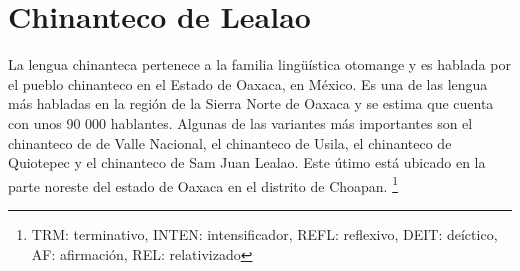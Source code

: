 \section*{Chinanteco de Lealao}

\noindent La lengua chinanteca pertenece a la familia lingüística otomange y es hablada por el pueblo chinanteco en el Estado de Oaxaca, en México. Es una de las lengua más habladas en la región de la Sierra Norte de Oaxaca y se estima que cuenta con unos 90 000 hablantes. Algunas de las variantes más importantes son el chinanteco de de Valle Nacional, el chinanteco de Usila, el chinanteco de Quiotepec y el chinanteco de Sam Juan Lealao. Este útimo está ubicado en la parte noreste del estado de Oaxaca en el distrito de Choapan. %
\footnote{TRM: terminativo, INTEN: intensificador, REFL: reflexivo, DEIT: deíctico, AF: afirmación, REL: relativizado}
\vspace{1cm}

